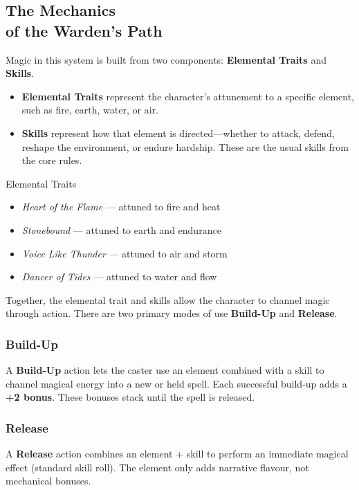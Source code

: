 \subsection{The Mechanics\\ of the Warden’s Path}

Magic in this system is built from two components: \textbf{Elemental Traits} and \textbf{Skills}.

\begin{itemize}
    \item \textbf{Elemental Traits} represent the character’s attunement to a specific element, such as fire, earth, water, or air.
    \item \textbf{Skills} represent how that element is directed—whether to attack, defend, reshape the environment, or endure hardship. These are the usual skills from the core rules.
\end{itemize}

\begin{Example}{Elemental Traits}
    \begin{itemize}
        \item \textit{Heart of the Flame} — attuned to fire and heat  
        \item \textit{Stonebound} — attuned to earth and endurance  
        \item \textit{Voice Like Thunder} — attuned to air and storm  
        \item \textit{Dancer of Tides} — attuned to water and flow  
    \end{itemize}
\end{Example}

Together, the elemental trait and skills allow the character to channel magic through action. There are two primary modes of use \textbf{Build-Up} and \textbf{Release}.

\subsubsection{Build-Up}
A \textbf{Build-Up} action lets the caster use an element combined with a skill to channel magical energy into a new or held spell. Each successful build-up adds a \textbf{+2 bonus}. These bonuses stack until the spell is released.


\subsubsection{Release}
A \textbf{Release} action combines an element + skill to perform an immediate magical effect (standard skill roll). The element only adds narrative flavour, not mechanical bonuses.


